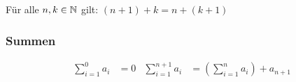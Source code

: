 Für alle $n, k \in \mathbb{N}$ gilt: $(n + 1) + k = n + (k + 1)$

% 

\subsubsection{Summen}
\begin{align*}
	\sum_{i=1}^0 a_i& = 0&
	\sum_{i=1}^{n+1} a_i& = \left( \sum_{i=1}^n a_i\right ) + a_{n+1}\\
\end{align*}

